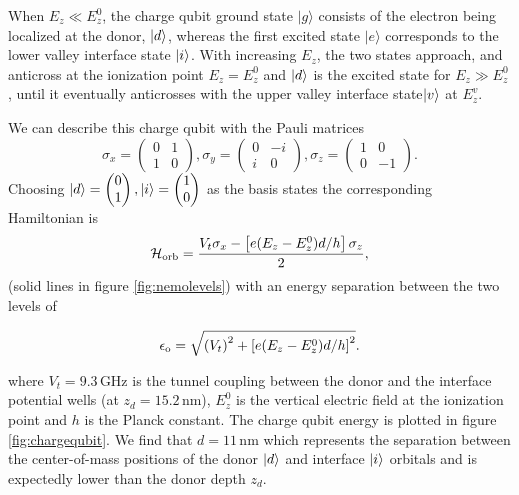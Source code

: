 When $E_z \ll E_z^0$, the charge qubit ground state $\lvert g \rangle $ consists of the electron being  localized at the donor, $|d\rangle$, whereas the first excited state $\lvert e \rangle $ corresponds to the lower valley interface state $|i\rangle$. 
With increasing $E_z$, the two states approach, and anticross at the ionization point $E_z = E_z^0$ and $|d\rangle$ is the excited state for $E_z \gg E_z^0$, until it eventually anticrosses with the upper valley interface state$|v\rangle$ at $E_z^v$. 

We can describe this charge qubit with the Pauli matrices 
\begin{equation}\sigma_x=\begin{pmatrix}0 & 1\\1 &0 \end{pmatrix}, \sigma_y=\begin{pmatrix}0 &-i\\i &0 \end{pmatrix}, \sigma_z=\begin{pmatrix}1 &0\\0 &-1 \end{pmatrix}.
\end{equation} 
Choosing $|d\rangle=\begin{pmatrix}0\\1 \end{pmatrix},|i\rangle=\begin{pmatrix}1\\0\end{pmatrix}$ as the basis states the corresponding Hamiltonian is
\begin{equation} \label{eq:H_orb}
\mathcal{H}_{\rm orb}=\frac{V_t \sigma_x-\left[e(E_z - E_z^0) d/h\right]\sigma_z}{2},
\end{equation}
(solid lines in figure \ref{fig:nemolevels}) with an energy separation between the two levels of 

\begin{equation} \label{eq:e_o}
\epsilon_{\rm o}=\sqrt{\left(V_t\right)^2+\left[e(E_z - E_z^0) d/h\right]^2}.
\end{equation}

where $V_t=9.3\,$GHz is the tunnel coupling between the donor and the interface potential wells (at $z_d=15.2\,$nm), $E_z^0$ is the vertical electric field at the ionization point and $h$ is the Planck constant. The charge qubit energy is plotted in figure \ref{fig:chargequbit}.  We find that $d=11\,$nm which represents the separation between the center-of-mass positions of the donor $|d\rangle$ and interface $|i\rangle$ orbitals and is expectedly lower than the donor depth $z_d$.

